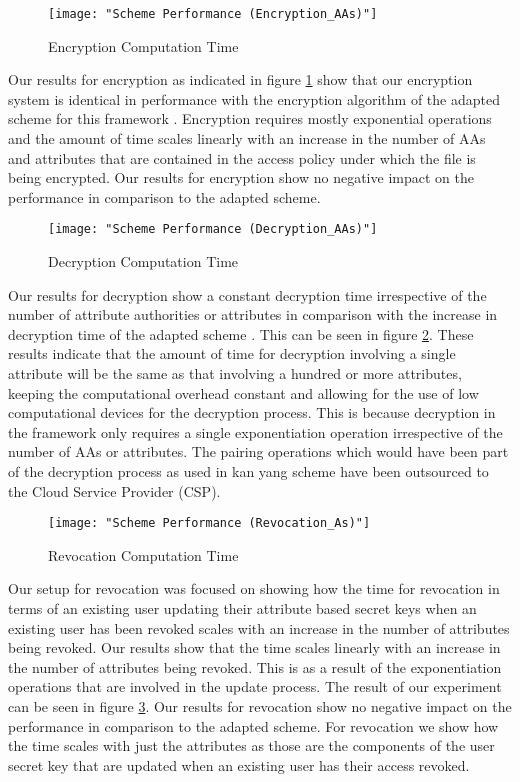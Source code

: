 \begin{figure}[]
	\centering
	\texttt{[image: "Scheme Performance (Encryption\_AAs)"]}
	\caption{Encryption Computation Time}
	\label{fig:res_enc_aas}
\end{figure}

Our results for encryption as indicated in figure \ref{fig:res_enc_aas} show that our encryption system is identical in performance with the encryption algorithm of the adapted scheme for this framework \cite{Yang2014}. Encryption requires mostly exponential operations and the amount of time scales linearly with an increase in the number of AAs and attributes that are contained in the access policy under which the file is being encrypted. Our results for encryption show no negative impact on the performance in comparison to the adapted scheme.

\begin{figure}[]
	\centering
	\texttt{[image: "Scheme Performance (Decryption\_AAs)"]}
	\caption{Decryption Computation Time}
	\label{fig:res_dec_aas}
\end{figure}

Our results for decryption show a constant decryption time irrespective of the number of attribute authorities or attributes in comparison with the increase in decryption time of the adapted scheme \cite{Yang2014}. This can be seen in figure \ref{fig:res_dec_aas}. These results indicate that the amount of time for decryption involving a single attribute will be the same as that involving a hundred or more attributes, keeping the computational overhead constant and allowing for the use of low computational devices for the decryption process. This is because decryption in the framework only requires a single exponentiation operation irrespective of the number of AAs or attributes. The pairing operations which would have been part of the decryption process as used in kan yang scheme \cite{Yang2014} have been outsourced to the Cloud Service Provider (CSP).

\begin{figure}[]
	\centering
	\texttt{[image: "Scheme Performance (Revocation\_As)"]}
	\caption{Revocation Computation Time}
	\label{fig:res_rev_as}
\end{figure}

Our setup for revocation was focused on showing how the time for revocation in terms of an existing user updating their attribute based secret keys when an existing user has been revoked scales with an increase in the number of attributes being revoked. Our results show that the time scales linearly with an increase in the number of attributes being revoked. This is as a result of the exponentiation operations that are involved in the update process. The result of our experiment can be seen in figure \ref{fig:res_rev_as}. Our results for revocation show no negative impact on the performance in comparison to the adapted scheme. For revocation we show how the time scales with just the attributes as those are the components of the user secret key that are updated when an existing user has their access revoked.


